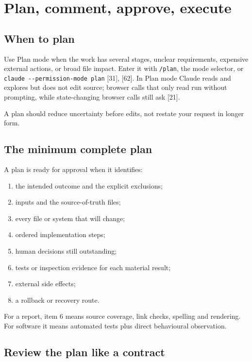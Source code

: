 \documentclass[11pt,a4paper,twoside,openany]{book}
\begin{document}
\chapter{Plan, comment, approve, execute}

\FloatBarrier
\setcounter{section}{0}
\section{When to plan}

Use Plan mode when the work has several stages, unclear requirements, expensive external actions, or broad file impact. Enter it with \texttt{/\allowbreak{}plan}, the mode selector, or \texttt{claude -\allowbreak{}-\allowbreak{}permission-\allowbreak{}mode plan} [31], [62]. In Plan mode Claude reads and explores but does not edit source; browser calls that only read run without prompting, while state-changing browser calls still ask [21].


A plan should reduce uncertainty before edits, not restate your request in longer form.


\FloatBarrier
\setcounter{section}{1}
\section{The minimum complete plan}

A plan is ready for approval when it identifies:


\begin{enumerate}
\item the intended outcome and the explicit exclusions;
\item inputs and the source-of-truth files;
\item every file or system that will change;
\item ordered implementation steps;
\item human decisions still outstanding;
\item tests or inspection evidence for each material result;
\item external side effects;
\item a rollback or recovery route.
\end{enumerate}

For a report, item 6 means source coverage, link checks, spelling and rendering. For software it means automated tests plus direct behavioural observation.


\FloatBarrier
\setcounter{section}{2}
\section{Review the plan like a contract}
\end{document}
